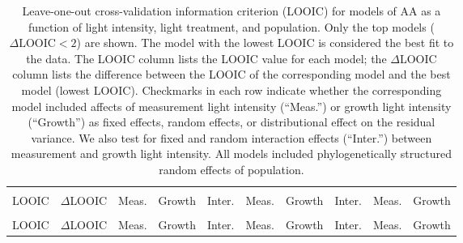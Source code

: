 \documentclass[
  letterpaper,
  DIV=11,
  numbers=noendperiod]{scrartcl}
\newcommand{\aax}{$\mathrm{AA}$}
\begin{document}
\begin{longtable}[t]{>{\centering\arraybackslash}p{0.7in}>{\centering\arraybackslash}p{0.5in}>{\centering\arraybackslash}p{0.4in}>{\centering\arraybackslash}p{0.4in}>{}c|>{\centering\arraybackslash}p{0.4in}>{\centering\arraybackslash}p{0.4in}>{}c|>{\centering\arraybackslash}p{0.4in}>{\centering\arraybackslash}p{0.4in}}

\caption{\label{tbl-aa_loo1}Leave-one-out cross-validation information
criterion (LOOIC) for models of \aax{} as a function of light intensity,
light treatment, and population. Only the top models
(\(\Delta \text{LOOIC} < 2\)) are shown. The model with the lowest LOOIC
is considered the best fit to the data. The LOOIC column lists the LOOIC
value for each model; the \(\Delta\)LOOIC column lists the difference
between the LOOIC of the corresponding model and the best model (lowest
LOOIC). Checkmarks in each row indicate whether the corresponding model
included affects of measurement light intensity (``Meas.'') or growth
light intensity (``Growth'') as fixed effects, random effects, or
distributional effect on the residual variance. We also test for fixed
and random interaction effects (``Inter.'') between measurement and
growth light intensity. All models included phylogenetically structured
random effects of population.}

\tabularnewline

\toprule
\multicolumn{2}{c}{ } & \multicolumn{3}{c}{Fixed} & \multicolumn{3}{c}{Random} & \multicolumn{2}{c}{Distributional} \\
\cmidrule(l{3pt}r{3pt}){3-5} \cmidrule(l{3pt}r{3pt}){6-8} \cmidrule(l{3pt}r{3pt}){9-10}
LOOIC & $\Delta$LOOIC & Meas. & Growth & Inter. & Meas. & Growth & Inter. & Meas. & Growth\\
\midrule
\endfirsthead
\multicolumn{10}{@{}l}{\textit{(continued)}}\\
\toprule
LOOIC & $\Delta$LOOIC & Meas. & Growth & Inter. & Meas. & Growth & Inter. & Meas. & Growth\\
\midrule
\endhead


\end{longtable}
\end{document}
